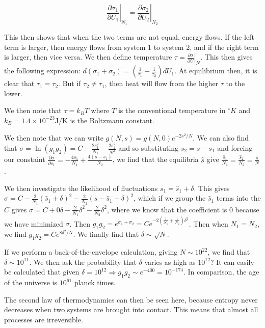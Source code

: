 \documentclass[12pt]{article}
\newcommand{\scinot}[2]{#1\times 10^{#2}}
\begin{document}
\[ \left. \frac{\partial \sigma_1}{\partial U_1} \right|_{N_1} = \left.\frac{\partial\sigma_2}{\partial U_2}\right|_{N_2}\]

This then shows that when the two terms are not equal, energy flows. If the left term is larger, then energy flows from system 1 to system 2, and if the right term is larger, then vice versa. We then define temperature $\tau = \left. \frac{\partial \sigma}{\partial U}\right|_{N}$. This then gives the following expression: $d(\sigma_1 + \sigma_2) = \left(\frac{1}{\tau_1} - \frac{1}{\tau_2}\right)dU_1$. At equilibrium then, it is clear that $\tau_1 = \tau_2$. But if $\tau_2 \neq \tau_1$, then heat will flow from the higher $\tau$ to the lower.

We then note that $\tau = k_B T$ where $T$ is the conventional temperature in $^\circ K$ and $k_B = \scinot{1.4}{-23}\mathrm{J/K}$ is the Boltzmann constant.

We then note that we can write $g(N,s) = g(N,0)e^{-2s^2/N}$. We can also find that $\sigma = \ln(g_1g_2) = C - \frac{2s_1^2}{N_1} - \frac{2s_2^2}{N^2}$ and so substituting $s_2 = s - s_1$ and forcing our constaint $\frac{\partial \sigma}{\partial s_1} = -\frac{4s_1}{N_1} + \frac{4(s-s_1)}{N_2}$, we find that the equilibria $\hat{s}$ give $\frac{\hat{s}_1}{N_1} = \frac{\hat{s}_2}{N_2} = \frac{s}{N}$. 

We then investigate the likelihood of fluctuations $s_1 = \hat{s}_1 + \delta$. This gives $\sigma = C - \frac{2}{N_1}(\hat{s}_1 + \delta)^2 - \frac{2}{N_2}(s-\hat{s}_1 - \delta)^2$, which if we group the $\hat{s}_1$ terms into the $C$ gives $\sigma = C + 0\delta - \frac{2}{N_1}\delta^2 - \frac{2}{N_2}\delta^2$, where we know that the coefficient is $0$ because we have minimized $\sigma$. Then $g_1g_2 = e^{\sigma_1 + \sigma_2} = Ce^{-2\left(\frac{1}{N_1} + \frac{1}{N_2}\right)\delta^2}$. Then when $N_1 = N_2$, we find $g_1g_2 = Ce^{8\delta^2/N}$. We finally find that $\delta \sim \sqrt{N}$. 

If we perform a back-of-the-envelope calculation, giving $N \sim 10^{22}$, we find that $\delta \sim 10^{11}$. We then ask the probability that $\delta$ varies as high as $10^{12}$? It can easily be calculated that given $\delta = 10^{12} \Rightarrow g_1g_2 \sim e^{-400} = 10^{-174}$. In comparison, the age of the universe is $10^{61}$ planck times.

The second law of thermodynamics can then be seen here, because entropy never decreases when two systems are brought into contact. This means that almost all processes are irreversible.
\end{document}
